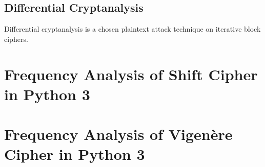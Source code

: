 \documentclass[12pt]{article}
\begin{document}
\subsection{Differential Cryptanalysis}
Differential cryptanalysis is a chosen plaintext attack technique on iterative block ciphers. \cite{diffanalysis}

\newpage


\newpage
\appendix

\section{Frequency Analysis of Shift Cipher in Python 3}



\newpage
\section{Frequency Analysis of Vigen\`{e}re Cipher in Python 3}


\end{document}
